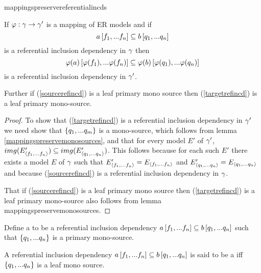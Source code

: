 mappingspreservereferentialincds
\begin{lemma}
\label{mappingspreservereferentialincds}
If $\varphi: \gamma \rightarrow \gamma'$ is a mapping of ER models and
if 
\begin{equation}
\label{sourcerefincd}
a\left[f_1,...f_n\right]\subseteq b\left[q_1,...q_n\right]
\end{equation}
is a referential inclusion dependency in $\gamma$ then  
\begin{equation}
\label{targetrefincd}
\varphi(a)\left[\varphi(f_1),...\varphi(f_n)\right]\subseteq\varphi(b)\left[\varphi(q_1),...\varphi(q_n)\right]
\end{equation}
is a referential inclusion dependency in $\gamma'$. 

Further if (\ref{sourcerefincd}) is a leaf primary mono source then (\ref{targetrefincd}) is a leaf primary mono-source.
\end{lemma}
\begin{proof}
To show that (\ref{targetrefincd}) is a referential inclusion dependency
 in $\gamma'$ we need show that $\left\{q_1,...q_m\right\}$ is a mono-source, which follows from lemma \ref{mappingspreservemonosources}, and that for every model $E'$ of $\gamma'$, 
$img(E'_{\langle f_1,...f_n\rangle}) \subseteq img(E'_{\langle q_1,...q_n\rangle})$. 
This follows because for each such $E'$ there exists a model $E$ of $\gamma$ such that 
$E'_{\langle f_1,...f_n\rangle}=E_{\langle f_1,...f_n\rangle}$ and $E'_{\langle q_1,...q_n\rangle}=E_{\langle q_1,...q_n\rangle}$ and because 
(\ref{sourcerefincd}) is a referential inclusion dependency in $\gamma$.

That if  (\ref{sourcerefincd}) is a leaf primary mono source then (\ref{targetrefincd}) is a leaf primary mono-source also follows from lemma {mappingspreservemonosources}.
\end{proof}


\begin{definition}
Define a  to be a
referential inclusion dependency $a\left[f_1,...f_n\right]\subseteq b\left[q_1,...q_n\right]$
such that $\left\{q_1,...q_n\right\}$ is a primary mono-source.
\end{definition}

\begin{definition} 
A referential inclusion dependency $a\left[f_1,...f_n\right]\subseteq b\left[q_1,...q_n\right]$ is said to be a  iff $\left\{q_1,...q_n\right\}$ is a leaf mono source.
\end{definition}

